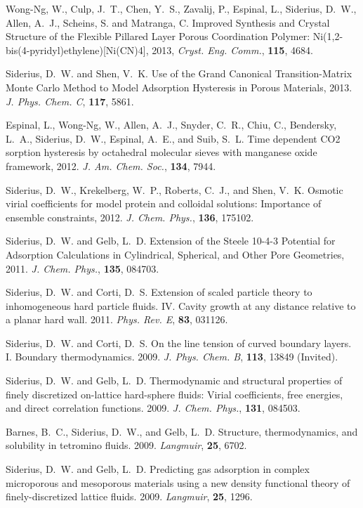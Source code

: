 Wong-Ng, W., Culp, J.~T., Chen, Y.~S., Zavalij, P., Espinal, L., Siderius, D.~W., Allen, A.~J., Scheins, S. and Matranga, C. Improved Synthesis and Crystal Structure of the Flexible Pillared Layer Porous Coordination Polymer: Ni(1,2-bis(4-pyridyl)ethylene)[Ni(CN)4], 2013, {\it Cryst. Eng. Comm.}, {\bf 115}, 4684.

Siderius, D.~W. and Shen, V.~K. Use of the Grand Canonical Transition-Matrix Monte Carlo Method to Model Adsorption Hysteresis in Porous Materials, 2013. {\it J. Phys. Chem. C}, {\bf 117}, 5861.

Espinal, L., Wong-Ng, W., Allen, A.~J., Snyder, C.~R., Chiu, C., Bendersky, L.~A., Siderius, D.~W., Espinal, A.~E., and Suib, S.~L. Time dependent CO2 sorption hysteresis by octahedral molecular sieves with manganese oxide framework, 2012. {\it J. Am. Chem. Soc.}, {\bf 134}, 7944.

Siderius, D.~W., Krekelberg, W.~P., Roberts, C.~J., and Shen, V.~K. Osmotic virial coefficients for model protein and colloidal solutions: Importance of ensemble constraints, 2012. {\it J. Chem. Phys.}, {\bf 136}, 175102.

Siderius, D.~W. and Gelb, L.~D. Extension of the Steele 10-4-3 Potential for Adsorption Calculations in Cylindrical, Spherical, and Other Pore Geometries, 2011. {\it J. Chem. Phys.}, {\bf 135}, 084703.

Siderius, D.~W. and Corti, D.~S. Extension of scaled particle theory to inhomogeneous hard particle fluids. IV. Cavity growth at any distance relative to a planar hard wall. 2011. {\it Phys. Rev. E}, {\bf 83}, 031126.

Siderius, D.~W. and Corti, D.~S. On the line tension of curved boundary layers. I. Boundary thermodynamics. 2009. {\it J. Phys. Chem. B}, {\bf 113}, 13849 (Invited).

Siderius, D.~W. and Gelb, L.~D. Thermodynamic and structural properties of finely discretized on-lattice hard-sphere fluids: Virial coefficients, free energies, and direct correlation functions. 2009. {\it J. Chem. Phys.}, {\bf 131}, 084503.

Barnes, B.~C., Siderius, D.~W., and Gelb, L.~D. Structure, thermodynamics, and solubility in tetromino fluids. 2009. {\it Langmuir}, {\bf 25}, 6702.

Siderius, D.~W. and Gelb, L.~D. Predicting gas adsorption in complex microporous and mesoporous materials using a new density functional theory of finely-discretized lattice fluids. 2009. {\it Langmuir}, {\bf 25}, 1296.


